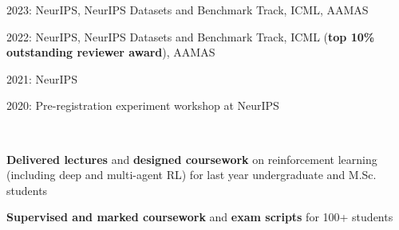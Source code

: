 \documentclass[]{lukas-cv-openfont}
\begin{document}


\noindent
\begin{tightitemize}{1.0em}
    \item 2023: NeurIPS, NeurIPS Datasets and Benchmark Track, ICML, AAMAS
    \item 2022: NeurIPS, NeurIPS Datasets and Benchmark Track, ICML (\textbf{top 10\% outstanding reviewer award}), AAMAS
    \item 2021: NeurIPS
    \item 2020: Pre-registration experiment workshop at NeurIPS
\end{tightitemize}
\sectionsep



\noindent
{}
\\
\begin{tightitemize}{1.7em}
    \item \textbf{Delivered lectures} and \textbf{designed coursework} on reinforcement learning (including deep and multi-agent RL) for last year undergraduate and M.Sc. students
    \item \textbf{Supervised and marked coursework} and \textbf{exam scripts} for 100+ students
\end{tightitemize}
\largesectionsep
\end{document}
